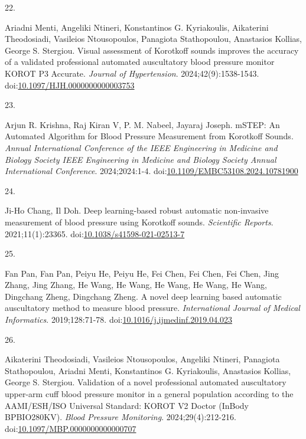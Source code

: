 \documentclass[
  12pt,
  letterpaper,
  openany,
  oneside]{book}
\newlength{\cslhangindent}
\newlength{\csllabelwidth}
\newenvironment{CSLReferences}[2] %
 {\begin{list}{}{%
  \setlength{\itemindent}{0pt}
  \setlength{\leftmargin}{0pt}
  \setlength{\parsep}{0pt}
  \ifodd #1
   \setlength{\leftmargin}{\cslhangindent}
   \setlength{\itemindent}{-1\cslhangindent}
  \fi
  \setlength{\itemsep}{#2\baselineskip}}}
 {\end{list}}
\newcommand{\CSLLeftMargin}[1]{\parbox[t]{\csllabelwidth}{\strut#1\strut}}
\newcommand{\CSLRightInline}[1]{\parbox[t]{\linewidth - \csllabelwidth}{\strut#1\strut}}
\begin{document}
\begin{CSLReferences}{0}{1}
\CSLLeftMargin{22. }%
\CSLRightInline{Ariadni Menti, Angeliki Ntineri, Konstantinos G.
Kyriakoulis, Aikaterini Theodosiadi, Vasileios Ntousopoulos, Panagiota
Stathopoulou, Anastasios Kollias, George S. Stergiou. Visual assessment
of {Korotkoff} sounds improves the accuracy of a validated professional
automated auscultatory blood pressure monitor {KOROT} {P3} {Accurate}.
\emph{Journal of Hypertension}. 2024;42(9):1538-1543.
doi:\href{https://doi.org/10.1097/HJH.0000000000003753}{10.1097/HJH.0000000000003753}}

\CSLLeftMargin{23. }%
\CSLRightInline{Arjun R. Krishna, Raj Kiran V, P. M. Nabeel, Jayaraj
Joseph. {mSTEP}: {An} {Automated} {Algorithm} for {Blood} {Pressure}
{Measurement} from {Korotkoff} {Sounds}. \emph{Annual International
Conference of the IEEE Engineering in Medicine and Biology Society IEEE
Engineering in Medicine and Biology Society Annual International
Conference}. 2024;2024:1-4.
doi:\href{https://doi.org/10.1109/EMBC53108.2024.10781900}{10.1109/EMBC53108.2024.10781900}}

\CSLLeftMargin{24. }%
\CSLRightInline{Ji-Ho Chang, Il Doh. Deep learning-based robust
automatic non-invasive measurement of blood pressure using {Korotkoff}
sounds. \emph{Scientific Reports}. 2021;11(1):23365.
doi:\href{https://doi.org/10.1038/s41598-021-02513-7}{10.1038/s41598-021-02513-7}}

\CSLLeftMargin{25. }%
\CSLRightInline{Fan Pan, Fan Pan, Peiyu He, Peiyu He, Fei Chen, Fei
Chen, Fei Chen, Jing Zhang, Jing Zhang, He Wang, He Wang, He Wang, He
Wang, He Wang, Dingchang Zheng, Dingchang Zheng. A novel deep learning
based automatic auscultatory method to measure blood pressure.
\emph{International Journal of Medical Informatics}. 2019;128:71-78.
doi:\href{https://doi.org/10.1016/j.ijmedinf.2019.04.023}{10.1016/j.ijmedinf.2019.04.023}}

\CSLLeftMargin{26. }%
\CSLRightInline{Aikaterini Theodosiadi, Vasileios Ntousopoulos, Angeliki
Ntineri, Panagiota Stathopoulou, Ariadni Menti, Konstantinos G.
Kyriakoulis, Anastasios Kollias, George S. Stergiou. Validation of a
novel professional automated auscultatory upper-arm cuff blood pressure
monitor in a general population according to the {AAMI}/{ESH}/{ISO}
{Universal} {Standard}: {KOROT} {V2} {Doctor} ({InBody} {BPBIO280KV}).
\emph{Blood Pressure Monitoring}. 2024;29(4):212-216.
doi:\href{https://doi.org/10.1097/MBP.0000000000000707}{10.1097/MBP.0000000000000707}}


\end{CSLReferences}
\end{document}
